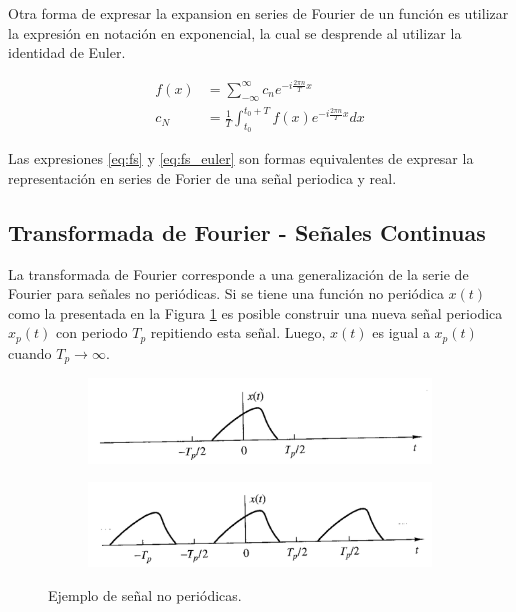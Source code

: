 \documentclass[
  letterpaper,
  twocolumn,
  9pt,
  journal,
  final]{IEEEtran}
\begin{document}
Otra forma de expresar la expansion en series de Fourier de un función es utilizar la expresión en notación en exponencial, la cual se desprende al utilizar la identidad de Euler.

\begin{align}
	f(x) &= \sum_{-\infty}^{\infty} c_n e ^ {-i \frac{2\pi n}{T} x} \label{eq:fs_euler}\\
	c_N &= \frac{1}{T} \int_{t_0}^{t_0 + T} f(x) e ^ {-i \frac{2\pi n}{T} x} dx
\end{align}

Las expresiones \ref{eq:fs} y \ref{eq:fs_euler} son formas equivalentes de expresar la representación en series de Forier de una señal periodica y real.

\subsection{Transformada de Fourier - Señales Continuas}

La transformada de Fourier corresponde a una generalización de la serie de Fourier para señales no periódicas.
Si se tiene una función no periódica $x(t)$ como la presentada en la Figura \ref{fig:senal_aperidica} es posible construir una nueva señal periodica $x_p(t)$ con periodo $T_p$ repitiendo esta señal. Luego, $x(t)$ es igual a $x_p(t)$ cuando $T_p \to \infty$.

\begin{figure}[h!]
\centering
	\begin{subfigure}[b]{\columnwidth}
	\includegraphics[width=1\linewidth, angle=-1]{imgs/proakis_aperiodic_1.png}
	\label{fig:senal_aperidica}
	\end{subfigure}

	\begin{subfigure}[b]{\columnwidth}
	\includegraphics[width=1\linewidth, angle=-1]{imgs/proakis_aperiodic_2.png}
	\label{fig:senal_aperidocia_repetida}
	\end{subfigure}

\caption{Ejemplo de señal no periódicas\cite{proakis}.}
\label{fig:p4_both}
\end{figure}
\end{document}
